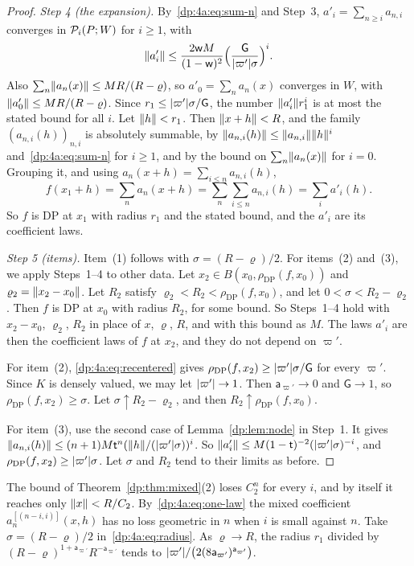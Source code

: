 \begin{proof}
\emph{Step 4 (the expansion).} By~\eqref{dp:4a:eq:sum-n} and Step~3, $a'_i=\sum_{n\ge i}a_{n,i}$ converges in $\mathcal P_i(P;W)$ for $i\ge1$, with
\begin{equation}\label{dp:4a:eq:recentered}
 \lVert a'_i\rVert\le\frac{2\mathsf wM}{(1-\mathsf w)^2}\Bigl(\frac{\mathsf G}{\lvert \varpi'\rvert\sigma}\Bigr)^i.
\end{equation}
Also $\sum_n\lVert a_n(x)\rVert\le MR/(R-\varrho)$, so $a'_0=\sum_na_n(x)$ converges in $W$, with $\lVert a'_0\rVert\le MR/(R-\varrho)$. Since $r_1\le\lvert \varpi'\rvert\sigma/\mathsf G$, the number $\lVert a'_i\rVert r_1^i$ is at most the stated bound for all $i$. Let $\lVert h\rVert<r_1$. Then $\lVert x+h\rVert<R$, and the family $(a_{n,i}(h))_{n,i}$ is absolutely summable, by $\lVert a_{n,i}(h)\rVert\le\lVert a_{n,i}\rVert\lVert h\rVert^i$ and~\eqref{dp:4a:eq:sum-n} for $i\ge1$, and by the bound on $\sum_n\lVert a_n(x)\rVert$ for $i=0$. Grouping it, and using $a_n(x+h)=\sum_{i\le n}a_{n,i}(h)$,
\[
 f(x_1+h)=\sum_na_n(x+h)=\sum_n\sum_{i\le n}a_{n,i}(h)=\sum_ia'_i(h).
\]
So $f$ is DP at $x_1$ with radius $r_1$ and the stated bound, and the $a'_i$ are its coefficient laws.

\emph{Step 5 (items).} Item~(1) follows with $\sigma=(R-\varrho)/2$. For items~(2) and~(3), we apply Steps~1--4 to other data. Let $x_2\in B(x_0,\rho_{\mathrm{DP}}(f,x_0))$ and $\varrho_2=\lVert x_2-x_0\rVert$. Let $R_2$ satisfy $\varrho_2<R_2<\rho_{\mathrm{DP}}(f,x_0)$, and let $0<\sigma<R_2-\varrho_2$. Then $f$ is DP at $x_0$ with radius $R_2$, for some bound. So Steps~1--4 hold with $x_2-x_0$, $\varrho_2$, $R_2$ in place of $x$, $\varrho$, $R$, and with this bound as $M$. The laws $a'_i$ are then the coefficient laws of $f$ at $x_2$, and they do not depend on $\varpi'$.

For item~(2), \eqref{dp:4a:eq:recentered} gives $\rho_{\mathrm{DP}}(f,x_2)\ge\lvert \varpi'\rvert\sigma/\mathsf G$ for every $\varpi'$. Since $K$ is densely valued, we may let $\lvert \varpi'\rvert\to1$. Then $\mathsf a_{\varpi'}\to0$ and $\mathsf G\to1$, so $\rho_{\mathrm{DP}}(f,x_2)\ge\sigma$. Let $\sigma\uparrow R_2-\varrho_2$, and then $R_2\uparrow\rho_{\mathrm{DP}}(f,x_0)$.

For item~(3), use the second case of Lemma~\ref{dp:lem:node} in Step~1. It gives $\lVert a_{n,i}(h)\rVert\le(n+1)M\mathsf t^n(\lVert h\rVert/(\lvert \varpi'\rvert\sigma))^i$. So $\lVert a'_i\rVert\le M(1-\mathsf t)^{-2}(\lvert \varpi'\rvert\sigma)^{-i}$, and $\rho_{\mathrm{DP}}(f,x_2)\ge\lvert \varpi'\rvert\sigma$. Let $\sigma$ and $R_2$ tend to their limits as before.
\end{proof}

\begin{remark}\label{dp:rem:whole-ball}
The bound of Theorem~\ref{dp:thm:mixed}(2) loses $C_2^n$ for every $i$, and by itself it reaches only $\lVert x\rVert<R/C_2$. By~\eqref{dp:4a:eq:one-law} the mixed coefficient $a_n^{[(n-i,i)]}(x,h)$ has no loss geometric in $n$ when $i$ is small against $n$. Take $\sigma=(R-\varrho)/2$ in~\eqref{dp:4a:eq:radius}. As $\varrho\to R$, the radius $r_1$ divided by $(R-\varrho)^{1+\mathsf a_{\varpi'}}R^{-\mathsf a_{\varpi'}}$ tends to $\lvert \varpi'\rvert/\bigl(2(8\mathsf a_{\varpi'})^{\mathsf a_{\varpi'}}\bigr)$.
\end{remark}

